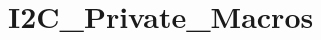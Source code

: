 \hypertarget{group___i2_c___private___macros}{}\section{I2\+C\+\_\+\+Private\+\_\+\+Macros}
\label{group___i2_c___private___macros}
